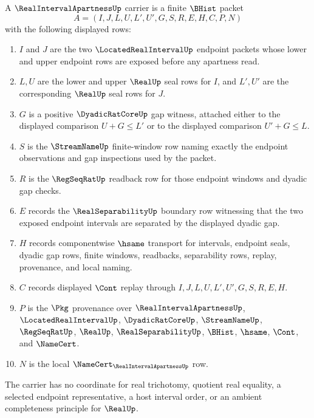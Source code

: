 \begin{definition}
\label{def:real-interval-apartness-carrier}
A $\RealIntervalApartnessUp$ carrier is a finite $\BHist$ packet
$$
A=(I,J,L,U,L',U',G,S,R,E,H,C,P,N)
$$
with the following displayed rows:
\begin{enumerate}
\item $I$ and $J$ are the two $\LocatedRealIntervalUp$ endpoint packets whose lower and upper endpoint rows are exposed before any apartness read.
\item $L,U$ are the lower and upper $\RealUp$ seal rows for $I$, and $L',U'$ are the corresponding $\RealUp$ seal rows for $J$.
\item $G$ is a positive $\DyadicRatCoreUp$ gap witness, attached either to the displayed comparison $U+G\leq L'$ or to the displayed comparison $U'+G\leq L$.
\item $S$ is the $\StreamNameUp$ finite-window row naming exactly the endpoint observations and gap inspections used by the packet.
\item $R$ is the $\RegSeqRatUp$ readback row for those endpoint windows and dyadic gap checks.
\item $E$ records the $\RealSeparabilityUp$ boundary row witnessing that the two exposed endpoint intervals are separated by the displayed dyadic gap.
\item $H$ records componentwise $\hsame$ transport for intervals, endpoint seals, dyadic gap rows, finite windows, readbacks, separability rows, replay, provenance, and local naming.
\item $C$ records displayed $\Cont$ replay through $I,J,L,U,L',U',G,S,R,E,H$.
\item $P$ is the $\Pkg$ provenance over $\RealIntervalApartnessUp$, $\LocatedRealIntervalUp$, $\DyadicRatCoreUp$, $\StreamNameUp$, $\RegSeqRatUp$, $\RealUp$, $\RealSeparabilityUp$, $\BHist$, $\hsame$, $\Cont$, and $\NameCert$.
\item $N$ is the local $\NameCert_{\RealIntervalApartnessUp}$ row.
\end{enumerate}
The carrier has no coordinate for real trichotomy, quotient real equality, a selected endpoint representative, a host interval order, or an ambient completeness principle for $\RealUp$.
\end{definition}

